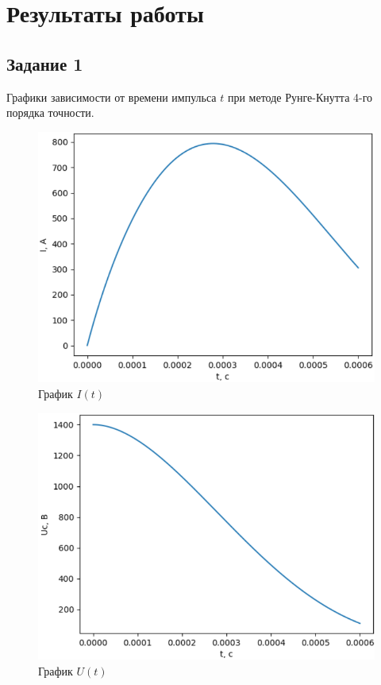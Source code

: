 \newpage
\section*{Результаты работы}

\subsection*{Задание 1}
Графики зависимости от времени импульса $t$ при методе Рунге-Кнутта 4-го порядка точности.
\begin{figure}[h]
	\caption{График $I(t)$}
	\includegraphics[scale=0.45]{img/1.png}
\end{figure}
\begin{figure}[h]
	\caption{График $U(t)$}
	\includegraphics[scale=0.45]{img/2.png}
\end{figure}
